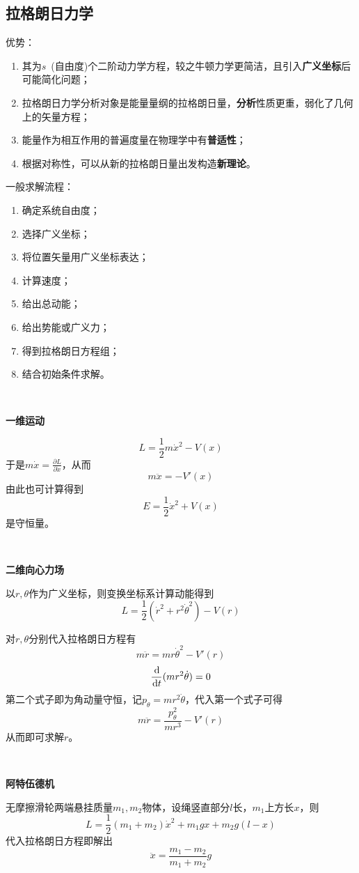 \documentclass[a4paper,UTF8,fontset=windows]{ctexart}
\newcommand*{\dr}{\hspace{0.07em}\mathrm{d}}
\begin{document}
\subsection{拉格朗日力学}
优势：
\begin{enumerate}
    \item 其为$s$\ (自由度)个二阶动力学方程，较之牛顿力学更简洁，且引入\textbf{广义坐标}后可能简化问题；
    \item 拉格朗日力学分析对象是能量量纲的拉格朗日量，\textbf{分析}性质更重，弱化了几何上的矢量方程；
    \item 能量作为相互作用的普遍度量在物理学中有\textbf{普适性}；
    \item 根据对称性，可以从新的拉格朗日量出发构造\textbf{新理论}。
\end{enumerate}

一般求解流程：
\begin{enumerate}
    \item 确定系统自由度；
    \item 选择广义坐标；
    \item 将位置矢量用广义坐标表达；
    \item 计算速度；
    \item 给出总动能；
    \item 给出势能或广义力；
    \item 得到拉格朗日方程组；
    \item 结合初始条件求解。
\end{enumerate}

\

\textbf{一维运动}

$$L=\frac{1}{2}m\dot{x}^2-V(x)$$
于是$m\dot{x}=\frac{\partial L}{\partial\dot{x}}$，从而
$$m\ddot{x}=-V'(x)$$
由此也可计算得到
$$E=\frac{1}{2}\dot{x}^2+V(x)$$
是守恒量。

\

\textbf{二维向心力场}

以$r,\theta$作为广义坐标，则变换坐标系计算动能得到
$$L=\frac{1}{2}(\dot{r}^2+r^2\dot{\theta}^2)-V(r)$$

对$r,\theta$分别代入拉格朗日方程有
$$m\ddot{r}=mr\dot{\theta}^2-V'(r)$$
$$\frac{\dr}{\dr t}(mr^2\dot{\theta})=0$$
第二个式子即为角动量守恒，记$p_\theta=mr^2\dot{\theta}$，代入第一个式子可得
$$m\ddot{r}=\frac{p_\theta^2}{mr^3}-V'(r)$$
从而即可求解$r$。

\

\textbf{阿特伍德机}

无摩擦滑轮两端悬挂质量$m_1,m_2$物体，设绳竖直部分$l$长，$m_1$上方长$x$，则
$$L=\frac{1}{2}(m_1+m_2)\dot{x}^2+m_1gx+m_2g(l-x)$$
代入拉格朗日方程即解出
$$\ddot{x}=\frac{m_1-m_2}{m_1+m_2}g$$
\end{document}
